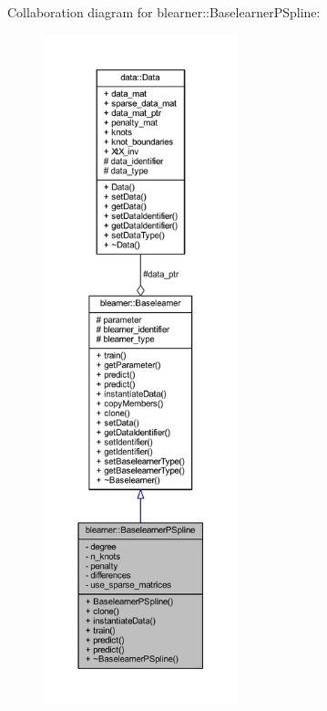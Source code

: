 Collaboration diagram for blearner\+:\+:Baselearner\+P\+Spline\+:
\nopagebreak
\begin{figure}[H]
\begin{center}
\leavevmode
\includegraphics[height=550pt]{classblearner_1_1_baselearner_p_spline__coll__graph}
\end{center}
\end{figure}
